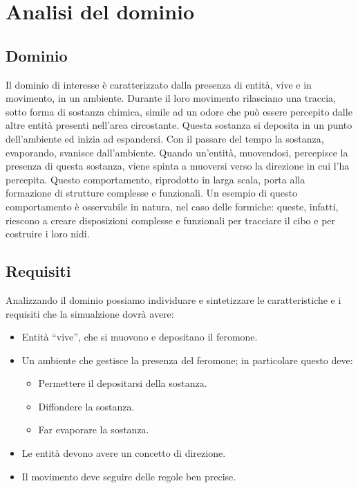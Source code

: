 \chapter{Analisi del dominio}
\section{Dominio}
Il dominio di interesse è caratterizzato dalla presenza di entità, vive e in movimento, in un ambiente.
Durante il loro movimento rilasciano una traccia,
sotto forma di sostanza chimica,
simile ad un odore che può essere percepito dalle altre entità presenti nell'area circostante. Questa sostanza
si deposita in un punto dell'ambiente ed inizia ad espandersi. Con il passare del tempo la sostanza, evaporando, svanisce dall'ambiente.
Quando un'entità, muovendosi, percepisce la presenza di questa sostanza, viene spinta a muoversi verso la direzione 
in cui l'ha percepita. Questo comportamento, riprodotto in larga scala, porta alla formazione di strutture complesse e funzionali.
Un esempio di questo comportamento è osservabile in natura, nel caso delle formiche: queste, infatti, riescono a 
creare disposizioni complesse e funzionali per tracciare il cibo e per costruire i loro nidi.
\section{Requisiti}
Analizzando il dominio possiamo individuare e sintetizzare
le caratteristiche e i requisiti che la simualzione dovrà avere:
\begin{itemize}
    \item Entità ``vive'', che si muovono e depositano il feromone.
    \item Un ambiente che gestisce la presenza del feromone; in particolare questo deve:
    \begin{itemize}
        \item Permettere il depositarsi della sostanza.
        \item Diffondere la sostanza.
        \item Far evaporare la sostanza.
    \end{itemize}
    \item Le entità devono avere un concetto di direzione.
    \item Il movimento deve seguire delle regole ben precise.
\end{itemize}

